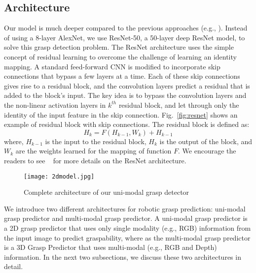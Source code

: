 \documentclass[10pt,twocolumn,letterpaper]{article}
\begin{document}
\subsection{Architecture}
Our model is much deeper compared to the previous approaches (e.g., \cite{lenz2015deep, 7487517, Redmon}). Instead of using a 8-layer AlexNet, we use ResNet-50, a 50-layer deep ResNet model, to solve this grasp detection problem. The ResNet architecture uses the simple concept of residual learning to overcome the challenge of learning an identity mapping. A standard feed-forward CNN is modified to incorporate skip connections that  bypass a few layers at a time. Each of these skip connections gives rise to a residual block, and the convolution layers predict a residual that is added to the block's input.  The key idea is to bypass the convolution layers and the non-linear activation layers in $k^{th}$ residual block, and let through only the identity of the input feature in the skip connection. Fig.~\ref{fig:resnet} shows an example of residual block with skip connections. The residual block is defined as:
\begin{equation}
\label{eq:resnet}
H_k = F(H_{k-1}, {W_k}) + H_{k-1}
\end{equation}
where, $H_{k-1}$ is the input to the residual block, $H_k$ is the output of the block, and $W_k$ are the weights learned for the mapping of function $F$. We encourage the readers to see ~\cite{he2015deep} for more details on the ResNet architecture.

\begin{figure*}[!th]
\begin{center}
\texttt{[image: 2dmodel.jpg]}
\end{center}
   \caption{Complete architecture of our uni-modal grasp detector}
\label{fig:2dmodel}
\end{figure*}

We introduce two different architectures for robotic grasp prediction: uni-modal grasp predictor and multi-modal grasp predictor. A uni-modal grasp predictor is a 2D grasp predictor that uses only single modality (e.g., RGB) information from the input image to predict graspability, where as the multi-modal grasp predictor is a 3D Grasp Predictor that uses multi-modal (e.g., RGB and Depth) information. In the next two subsections, we discuss these two architectures in detail.
\end{document}
